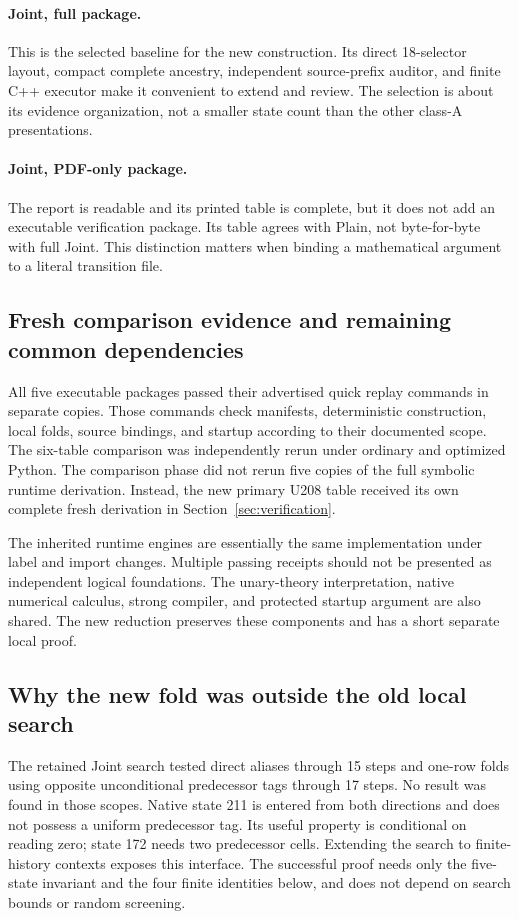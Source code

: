 \paragraph{Joint, full package.}
This is the selected baseline for the new construction. Its direct
18-selector layout, compact complete ancestry, independent source-prefix
auditor, and finite C++ executor make it convenient to extend and review.
The selection is about its evidence organization, not a smaller state count
than the other class-A presentations.

\paragraph{Joint, PDF-only package.}
The report is readable and its printed table is complete, but it does
not add an executable verification package. Its table agrees with
Plain, not byte-for-byte with full Joint. This distinction matters when
binding a mathematical argument to a literal transition file.

\subsection{Fresh comparison evidence and remaining common dependencies}
All five executable packages passed their advertised quick replay
commands in separate copies. Those commands check manifests, deterministic
construction, local folds, source bindings, and startup according to their
documented scope. The six-table comparison was independently rerun under
ordinary and optimized Python. The comparison phase did not rerun five
copies of the full symbolic runtime derivation. Instead, the new primary
U208 table received its own complete fresh derivation in
Section~\ref{sec:verification}.

The inherited runtime engines are essentially the same implementation
under label and import changes. Multiple passing receipts should not be
presented as independent logical foundations. The unary-theory
interpretation, native numerical calculus, strong compiler, and protected
startup argument are also shared. The new reduction preserves these
components and has a short separate local proof.

\subsection{Why the new fold was outside the old local search}
The retained Joint search tested direct aliases through 15 steps and
one-row folds using opposite unconditional predecessor tags through
17 steps. No result was found in those scopes. Native state 211 is
entered from both directions and does not possess a uniform predecessor
tag. Its useful property is conditional on reading zero; state 172
needs two predecessor cells. Extending the search to finite-history
contexts exposes this interface. The successful proof needs only the
five-state invariant and the four finite identities below, and does
not depend on search bounds or random screening.
